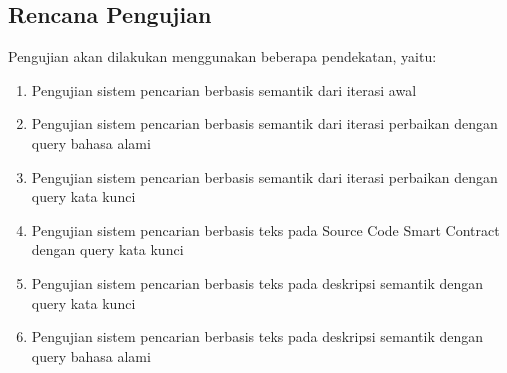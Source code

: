 \subsection{Rencana Pengujian}

Pengujian akan dilakukan menggunakan beberapa pendekatan, yaitu:

\begin{enumerate}
	\item Pengujian sistem pencarian berbasis semantik dari iterasi awal
	\item Pengujian sistem pencarian berbasis semantik dari iterasi perbaikan dengan query bahasa alami
	\item Pengujian sistem pencarian berbasis semantik dari iterasi perbaikan dengan query kata kunci 
	\item Pengujian sistem pencarian berbasis teks pada Source Code Smart Contract dengan query kata kunci
	\item Pengujian sistem pencarian berbasis teks pada deskripsi semantik dengan query kata kunci
	\item Pengujian sistem pencarian berbasis teks pada deskripsi semantik dengan query bahasa alami
\end{enumerate}